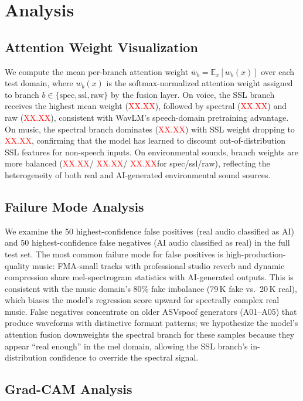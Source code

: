 \documentclass[10pt,twocolumn,a4paper]{article}
\newcommand{\NUM}{\textcolor{red}{XX.XX}}
\begin{document}
\section{Analysis}
\label{sec:analysis}

\subsection{Attention Weight Visualization}

We compute the mean per-branch attention weight $\bar{w}_b = \mathbb{E}_{x}[w_b(x)]$ over each test domain, where $w_b(x)$ is the softmax-normalized attention weight assigned to branch $b \in \{\text{spec}, \text{ssl}, \text{raw}\}$ by the fusion layer. On voice, the SSL branch receives the highest mean weight (\NUM), followed by spectral (\NUM) and raw (\NUM), consistent with WavLM's speech-domain pretraining advantage. On music, the spectral branch dominates (\NUM) with SSL weight dropping to \NUM, confirming that the model has learned to discount out-of-distribution SSL features for non-speech inputs. On environmental sounds, branch weights are more balanced (\NUM / \NUM / \NUM for spec/ssl/raw), reflecting the heterogeneity of both real and AI-generated environmental sound sources.

\subsection{Failure Mode Analysis}

We examine the 50 highest-confidence false positives (real audio classified as AI) and 50 highest-confidence false negatives (AI audio classified as real) in the full test set. The most common failure mode for false positives is high-production-quality music: FMA-small tracks with professional studio reverb and dynamic compression share mel-spectrogram statistics with AI-generated outputs. This is consistent with the music domain's 80\% fake imbalance (79\,K fake vs.\ 20\,K real), which biases the model's regression score upward for spectrally complex real music. False negatives concentrate on older ASVspoof generators (A01--A05) that produce waveforms with distinctive formant patterns; we hypothesize the model's attention fusion downweights the spectral branch for these samples because they appear ``real enough'' in the mel domain, allowing the SSL branch's in-distribution confidence to override the spectral signal.

\subsection{Grad-CAM Analysis}
\end{document}
